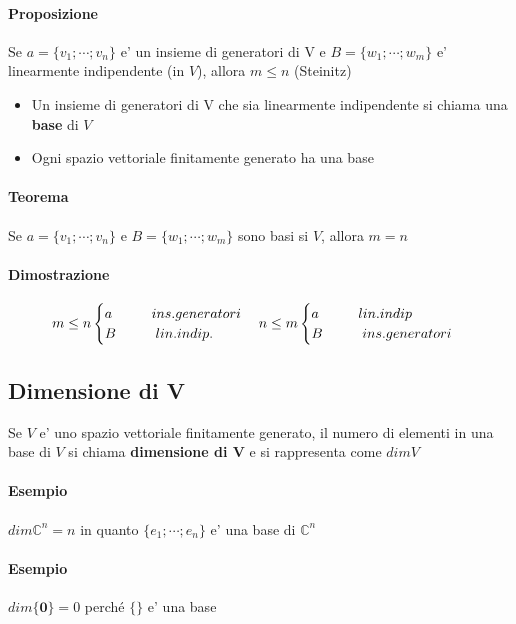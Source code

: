\documentclass[a4paper, 10pt]{article}
\begin{document}
	\paragraph*{Proposizione} Se $a = \lbrace v_1 ; \cdots ; v_n \rbrace$ e' un insieme di generatori di V e 
						 $B = \lbrace w_1; \cdots; w_m \rbrace$ e' linearmente indipendente (in $V$), allora $m \leq n$ (Steinitz)
	\begin{itemize}
		\item Un insieme di generatori di V che sia linearmente indipendente si chiama una \textbf{base} di $V$
		\item Ogni spazio vettoriale finitamente generato ha una base
	\end{itemize}
	
	\paragraph*{Teorema} Se $a = \lbrace v_1 ; \cdots ; v_n \rbrace$ e $B = \lbrace w_1; \cdots; w_m \rbrace$ 
						sono basi si $V$, allora $m = n$
	\paragraph*{Dimostrazione} 
	\[ 
		m \leq n
		\begin{cases}
			a \hspace{1.0cm} ins.generatori \\
			B \hspace{1.0cm} lin.indip.
		\end{cases}
		n \leq m
		\begin{cases}
			a \hspace{1.0cm} lin.indip \\
			B \hspace{1.0cm} ins.generatori
		\end{cases}
	\]
	
	\subsection{Dimensione di V}
	Se $V$ e' uno spazio vettoriale finitamente generato, il numero di elementi in una base di $V$ si chiama 
	\textbf{dimensione di V} e si rappresenta come $dimV$
	\paragraph*{Esempio} $dim\mathbb{C}^n = n$ in quanto $\lbrace e_1; \cdots; e_n \rbrace$ e' una base di $\mathbb{C}^n$
	\paragraph*{Esempio} $dim \lbrace \textbf{0} \rbrace = 0$ perché $\lbrace \rbrace$ e' una base
\end{document}
